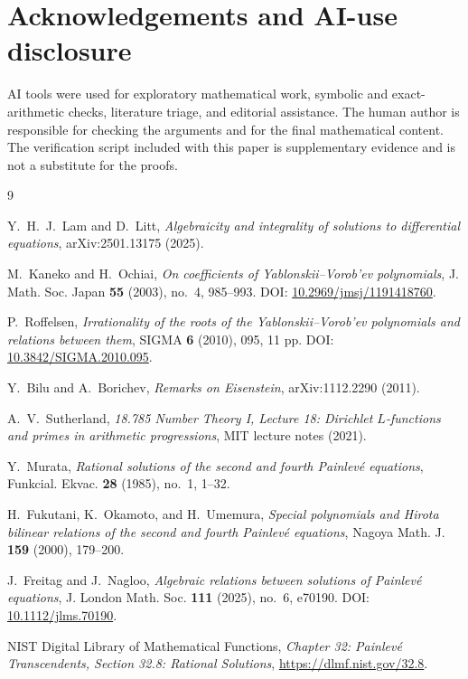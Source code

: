 \documentclass[11pt,a4paper,reqno]{amsart}
\theoremstyle{definition}
\theoremstyle{remark}
\begin{document}
\section*{Acknowledgements and AI-use disclosure}
AI tools were used for exploratory mathematical work, symbolic and exact-arithmetic checks, literature triage, and editorial assistance. The human author is responsible for checking the arguments and for the final mathematical content. The verification script included with this paper is supplementary evidence and is not a substitute for the proofs.

\begin{thebibliography}{9}

Y.~H.~J.~Lam and D.~Litt,
\emph{Algebraicity and integrality of solutions to differential equations},
arXiv:2501.13175 (2025).

M.~Kaneko and H.~Ochiai,
\emph{On coefficients of Yablonskii--Vorob'ev polynomials},
J. Math. Soc. Japan \textbf{55} (2003), no.~4, 985--993.
DOI: \href{https://doi.org/10.2969/jmsj/1191418760}{10.2969/jmsj/1191418760}.

P.~Roffelsen,
\emph{Irrationality of the roots of the Yablonskii--Vorob'ev polynomials and relations between them},
SIGMA \textbf{6} (2010), 095, 11 pp.
DOI: \href{https://doi.org/10.3842/SIGMA.2010.095}{10.3842/SIGMA.2010.095}.

Y.~Bilu and A.~Borichev,
\emph{Remarks on Eisenstein},
arXiv:1112.2290 (2011).

A.~V.~Sutherland,
\emph{18.785 Number Theory I, Lecture 18: Dirichlet $L$-functions and primes in arithmetic progressions},
MIT lecture notes (2021).

Y.~Murata,
\emph{Rational solutions of the second and fourth Painlev\'e equations},
Funkcial. Ekvac. \textbf{28} (1985), no.~1, 1--32.

H.~Fukutani, K.~Okamoto, and H.~Umemura,
\emph{Special polynomials and Hirota bilinear relations of the second and fourth Painlev\'e equations},
Nagoya Math. J. \textbf{159} (2000), 179--200.

J.~Freitag and J.~Nagloo,
\emph{Algebraic relations between solutions of Painlev\'e equations},
J. London Math. Soc. \textbf{111} (2025), no.~6, e70190.
DOI: \href{https://doi.org/10.1112/jlms.70190}{10.1112/jlms.70190}.

NIST Digital Library of Mathematical Functions,
\emph{Chapter 32: Painlev\'e Transcendents, Section 32.8: Rational Solutions},
\url{https://dlmf.nist.gov/32.8}.

\end{thebibliography}
\end{document}
